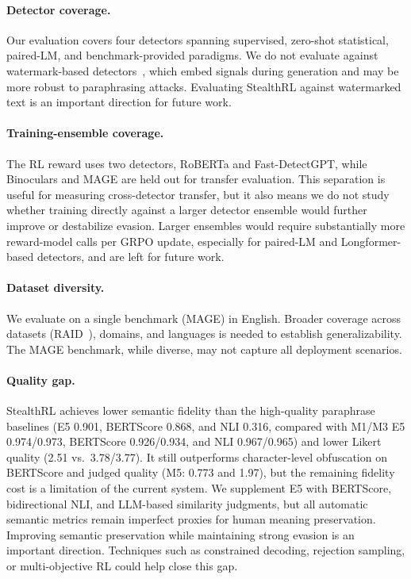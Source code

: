 \documentclass[11pt]{article}
\begin{document}
\paragraph{Detector coverage.} Our evaluation covers four detectors spanning supervised, zero-shot statistical, paired-LM, and benchmark-provided paradigms. We do not evaluate against watermark-based detectors~\cite{kirchenbauer2023watermark}, which embed signals during generation and may be more robust to paraphrasing attacks. Evaluating StealthRL against watermarked text is an important direction for future work.

\paragraph{Training-ensemble coverage.} The RL reward uses two detectors, RoBERTa and Fast-DetectGPT, while Binoculars and MAGE are held out for transfer evaluation. This separation is useful for measuring cross-detector transfer, but it also means we do not study whether training directly against a larger detector ensemble would further improve or destabilize evasion. Larger ensembles would require substantially more reward-model calls per GRPO update, especially for paired-LM and Longformer-based detectors, and are left for future work.

\paragraph{Dataset diversity.} We evaluate on a single benchmark (MAGE) in English. Broader coverage across datasets (RAID~\cite{dugan2024raidsharedbenchmarkrobust}), domains, and languages is needed to establish generalizability. The MAGE benchmark, while diverse, may not capture all deployment scenarios.

\paragraph{Quality gap.} StealthRL achieves lower semantic fidelity than the high-quality paraphrase baselines (E5 0.901, BERTScore 0.868, and NLI 0.316, compared with M1/M3 E5 0.974/0.973, BERTScore 0.926/0.934, and NLI 0.967/0.965) and lower Likert quality (2.51 vs.\ 3.78/3.77). It still outperforms character-level obfuscation on BERTScore and judged quality (M5: 0.773 and 1.97), but the remaining fidelity cost is a limitation of the current system. We supplement E5 with BERTScore, bidirectional NLI, and LLM-based similarity judgments, but all automatic semantic metrics remain imperfect proxies for human meaning preservation. Improving semantic preservation while maintaining strong evasion is an important direction. Techniques such as constrained decoding, rejection sampling, or multi-objective RL could help close this gap.
\end{document}
